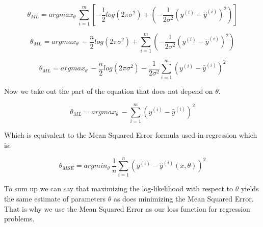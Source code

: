 $$ \theta_{ML} = argmax_{\theta} ~ \sum_{i=1}^{m} \left[ - \frac{1}{2} log  \left( 2 \pi \sigma^2 \right) + \left( -\frac{1}{2 \sigma^2} (y^{(i)} - \hat{y}^{(i)})^2  \right)  \right] $$

$$ \theta_{ML} = argmax_{\theta} ~   - \frac{n}{2} log  \left( 2 \pi \sigma^2 \right) +  \sum_{i=1}^{m} \left( -\frac{1}{2 \sigma^2} (y^{(i)} - \hat{y}^{(i)})^2  \right)   $$

$$ \theta_{ML} = argmax_{\theta} ~   - \frac{n}{2} log  \left( 2 \pi \sigma^2 \right) - \frac{1}{2 \sigma^2}  \sum_{i=1}^{m} \left(  y^{(i)} - \hat{y}^{(i)}  \right)^2   $$

\noindent Now we take out the part of the equation that does not depend on $\theta$.

$$ \theta_{ML} = argmax_{\theta} ~   - \sum_{i=1}^{m} \left(  y^{(i)} - \hat{y}^{(i)}  \right)^2   $$

\newpage
\noindent Which is equivalent to the Mean Squared Error formula used in regression which is:

$$ \theta_{MSE} = argmin_{\theta} ~ \frac{1}{n} \sum_{i=1}^{n} (y^{(i)} - \hat{y}^{(i)}(x, \theta) )^2 $$

\noindent To sum up we can say that maximizing the log-likelihood with respect to $\theta$ yields the same estimate of parameters $\theta$ as does minimizing the Mean Squared Error. That is why we use the Mean Squared Error as our loss function for regression problems.





